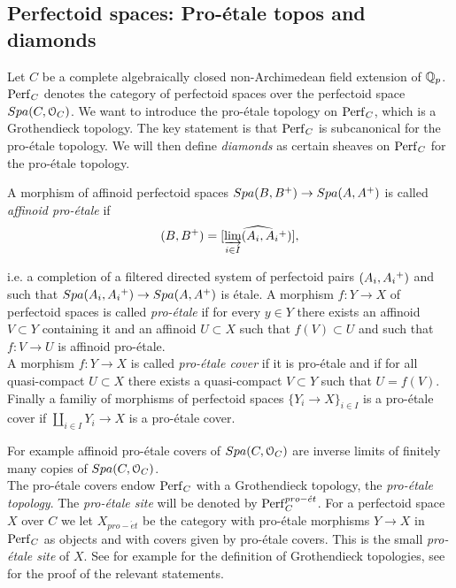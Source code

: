 \subsection{Perfectoid spaces: Pro-\'{e}tale topos and diamonds}
Let $C$ be a complete algebraically closed non-Archimedean field extension of $\mathbb{Q}_p$.
$\mathrm{Perf}_{C}$ denotes the category of perfectoid spaces over the perfectoid space ${Spa({C},{\mathcal{O}_C})}$.
We want to introduce the pro-\'{e}tale topology on $\mathrm{Perf}_{C}$, which is a Grothendieck topology. The key statement is that $\mathrm{Perf}_{C}$ is subcanonical for the pro-\'{e}tale topology. We will then define \emph{diamonds} as certain sheaves on $\mathrm{Perf}_{C}$ for the  pro-\'{e}tale topology.

\begin{definition}
A morphism of affinoid perfectoid spaces ${Spa({B},{B{^{+}}})}\to{Spa({A},{A{^{+}}})}$ is called \emph{affinoid pro-\'{e}tale} if
\[(B,B{^{+}}) = \widehat{[\varinjlim_{i\in I}(A_i,A_i{^{+}})]},\]

i.e. a completion of a filtered directed system of perfectoid pairs $(A_i,A_i{^{+}})$ and such that
${Spa({A_i},{A_i{^{+}}})}\to{Spa({A},{A{^{+}}})}$ is \'{e}tale.
A morphism $f\colon Y\to X$ of perfectoid spaces is called \emph{pro-\'{e}tale} if for every $y\in Y$ there exists an affinoid $V\subset Y$ containing it and an affinoid $U\subset X$ such that $f(V)\subset U$ and such that $f\colon V\to U$ is affinoid pro-\'{e}tale.\\
A morphism $f\colon Y\to X$ is called \emph{pro-\'{e}tale cover} if it is pro-\'{e}tale and if for all quasi-compact $U\subset X$ there exists a quasi-compact $V\subset Y$ such that $U=f(V).$
Finally a familiy of morphisms of perfectoid spaces $\{Y_i\to X\}_{i\in I}$ is a pro-\'{e}tale cover if $\coprod_{i\in I}Y_i\to X$ is a pro-\'{e}tale cover.
\end{definition}
For example  affinoid pro-\'{e}tale covers of ${Spa({C},{\mathcal{O}_C})}$ are inverse limits of finitely many copies of ${Spa({C},{\mathcal{O}_C})}$.\\

The pro-\'{e}tale covers endow $\mathrm{Perf}_{C}$ with a Grothendieck topology, the \emph{pro-\'{e}tale topology}. The \emph{pro-\'{e}tale site} will be denoted by $\mathrm{Perf}_{C}^{pro-\acute{e}t}$.
For a perfectoid space $X$ over $C$ we let $X_{pro-\acute{e}t}$ be the category with pro-\'{e}tale
morphisms $Y\to X$ in $\mathrm{Perf}_{C}$ as objects and with covers given by pro-\'{e}tale covers. This is the small \emph{pro-\'{e}tale site} of $X$.
See for example \cite{Artin62} for the definition of Grothendieck topologies, see \cite{Scholzeetcoh21} for the proof
of the relevant statements.\\

